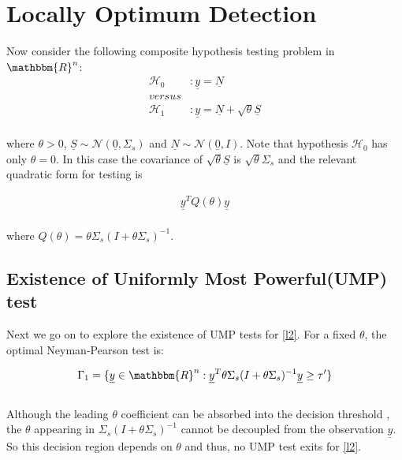 \documentclass[12pt]{report}
\begin{document}
\section{Locally Optimum Detection}
Now consider the following composite hypothesis testing problem in $\mathbbm{R}^{n}$:
\begin{equation}
\label{l2}
\begin{aligned}
\mathcal{H}_0 &: {\underline{y}} = {\underline{N}}\\
versus \\
\mathcal{H}_1 &: {\underline{y}} = {\underline{N}}+\sqrt{\theta}{\underline{S}}
\end{aligned}
\end{equation}\\
where $\theta > 0$, ${\underline{S}} \sim \mathcal{N}({\underline{0}},\Sigma_s)$ and ${\underline{N}} \sim \mathcal{N}({\underline{0}},I)$. Note that hypothesis $\mathcal{H}_{0}$ has only $\theta=0$. In this case the covariance of $\sqrt{\theta}{\underline{S}}$ is $\sqrt{\theta}\Sigma_s$ and the relevant quadratic form for testing is 

\begin{equation}
\label{l3}
\begin{aligned}
{\underline{y}}^TQ(\theta){\underline{y}}
\end{aligned}
\end{equation}\\
where $Q(\theta)=\theta\Sigma_s(I+\theta\Sigma_s)^{-1}$.
	
\subsection{Existence of Uniformly Most Powerful(UMP) test}
Next we go on to explore the existence of UMP tests for \eqref{l2}. For a fixed $\theta$, the optimal Neyman-Pearson test is: 

\begin{equation}
\begin{aligned}
\Gamma_{1} = \{{\underline{y}} \in \mathbbm{R}^{n} : {\underline{y}}^T\theta\Sigma_s(I+\theta\Sigma_s)^{-1}{\underline{y}} \geq \tau'\}
\end{aligned}
\end{equation}\\
Although the leading $\theta$ coefficient can be absorbed into the decision threshold , the $\theta$ appearing in $\Sigma_s(I+\theta\Sigma_s)^{-1}$ cannot be decoupled from the observation ${\underline{y}}$. So this decision region depends on $\theta$ and thus, no UMP test exits for \eqref{l2}.
 
\end{document}
